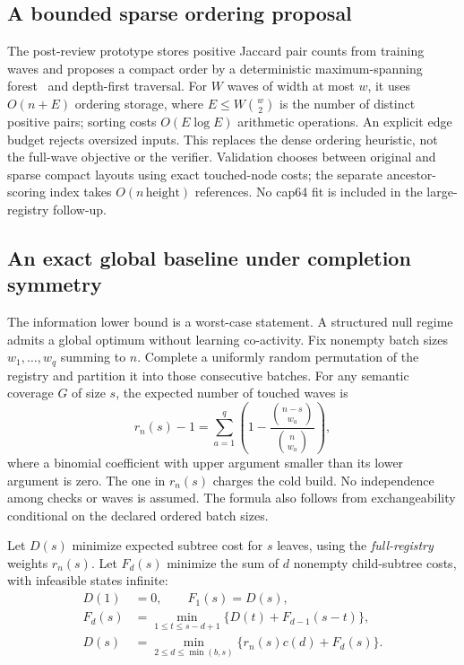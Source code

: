 \documentclass[10pt,journal,compsoc]{IEEEtran}
\theoremstyle{definition}\newtheorem{definition}[theorem]{Definition}
\begin{document}
\subsection{A bounded sparse ordering proposal}\label{sec:sparse}
The post-review prototype stores positive Jaccard pair counts from training
waves and proposes a compact order by a deterministic maximum-spanning
forest~\cite{kruskal} and depth-first traversal. For $W$ waves of width at most $w$, it
uses $O(n+E)$ ordering storage, where $E\le W\binom w2$ is the number of
distinct positive pairs; sorting costs $O(E\log E)$ arithmetic operations.
An explicit edge budget rejects oversized inputs. This replaces the dense
ordering heuristic, not the full-wave objective or the verifier. Validation
chooses between original and sparse compact layouts using exact touched-node
costs; the separate ancestor-scoring index takes $O(n\,\mathrm{height})$
references. No cap64 fit is included in the large-registry follow-up.
\subsection{An exact global baseline under completion symmetry}\label{sec:symmetry}
The information lower bound is a worst-case statement. A structured null
regime admits a global optimum without learning co-activity. Fix nonempty
batch sizes $w_1,\ldots,w_q$ summing to $n$. Complete a uniformly random
permutation of the registry and partition it into those consecutive batches.
For any semantic coverage $G$ of size $s$, the expected number of touched
waves is
\begin{equation}\label{eq:symmetry-weight}
 r_n(s)-1=\sum_{a=1}^q\left(1-
       \frac{\binom{n-s}{w_a}}{\binom n{w_a}}\right),
\end{equation}
where a binomial coefficient with upper argument smaller than its lower
argument is zero. The one in $r_n(s)$ charges the cold build.
No independence among checks or waves is assumed. The formula also follows
from exchangeability conditional on the declared ordered batch sizes.

Let $D(s)$ minimize expected subtree cost for $s$ leaves, using the
\emph{full-registry} weights $r_n(s)$. Let $F_d(s)$ minimize the sum of
$d$ nonempty child-subtree costs, with infeasible states infinite:
\begin{align}
 D(1)&=0,\qquad F_1(s)=D(s),\nonumber\\
 F_d(s)&=\min_{1\le t\le s-d+1}\{D(t)+F_{d-1}(s-t)\},\nonumber\\
 D(s)&=\min_{2\le d\le\min(b,s)}
        \{r_n(s)c(d)+F_d(s)\}.\label{eq:symmetry-dp}
\end{align}
\end{document}

